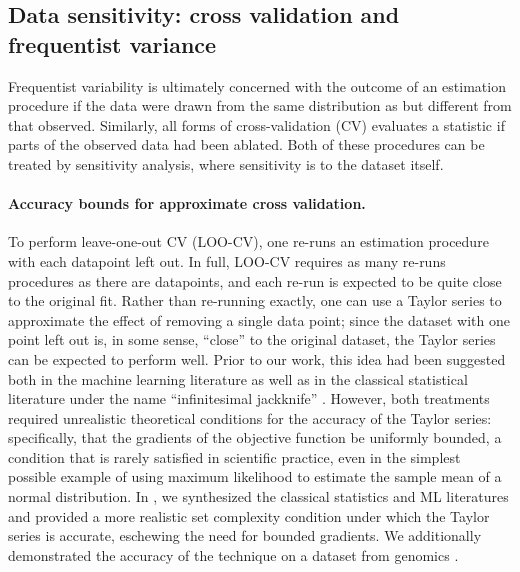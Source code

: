\subsection*{Data sensitivity: cross validation and frequentist variance}

Frequentist variability is ultimately concerned with the outcome of an
estimation procedure if the data were drawn from the same distribution as but
different from that observed.  Similarly, all forms of cross-validation (CV)
evaluates a statistic if parts of the observed data had been ablated.  Both of
these procedures can be treated by sensitivity analysis, where sensitivity
is to the dataset itself.

\paragraph{Accuracy bounds for approximate cross validation.}

To perform leave-one-out CV (LOO-CV), one re-runs an estimation procedure with
each datapoint left out.  In full, LOO-CV requires as many re-runs procedures as
there are datapoints, and each re-run is expected to be quite close to the
original fit.  Rather than re-running exactly, one can use a Taylor series to
approximate the effect of removing a single data point; since the dataset with
one point left out is, in some sense, ``close'' to the original dataset, the
Taylor series can be expected to perform well.  Prior to our work, this idea had
been suggested both in the machine learning literature
\citep{rad:2018:scalableloo, koh:2017:blackbox} as well as in the classical
statistical literature under the name ``infinitesimal jackknife''
\citep{jaeckel:1972:infinitesimal, shao:2012:jackknife}.  However, both
treatments required unrealistic theoretical conditions for the accuracy of the
Taylor series: specifically, that the gradients of the objective function be
uniformly bounded, a condition that is rarely satisfied in scientific practice,
even in the simplest possible example of using maximum likelihood to estimate
the sample mean of a normal distribution. In \citet{giordano:2019:ij}, we
synthesized the classical statistics and ML literatures and provided a more
realistic set complexity condition under which the Taylor series is accurate,
eschewing the need for bounded gradients.  We additionally demonstrated the
accuracy of the technique on a dataset from genomics \citep{shoemaker:2015:ultrasensitive}.



